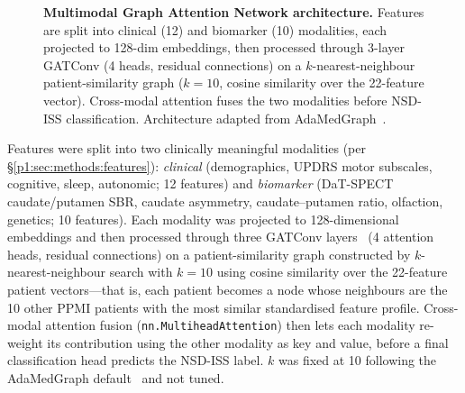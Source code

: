 \begin{figure}[!t]
\caption{\textbf{Multimodal Graph Attention Network architecture.} Features are split into clinical (12) and biomarker (10) modalities, each projected to 128-dim embeddings, then processed through 3-layer GATConv (4 heads, residual connections) on a $k$-nearest-neighbour patient-similarity graph ($k{=}10$, cosine similarity over the 22-feature vector). Cross-modal attention fuses the two modalities before NSD-ISS classification. Architecture adapted from AdaMedGraph~\cite{adamedgraph}.}
\label{p1:fig:architecture}
\end{figure}

Features were split into two clinically meaningful modalities (per \S\ref{p1:sec:methods:features}): \textit{clinical} (demographics, UPDRS motor subscales, cognitive, sleep, autonomic; 12 features) and \textit{biomarker} (DaT-SPECT caudate/putamen SBR, caudate asymmetry, caudate--putamen ratio, olfaction, genetics; 10 features). Each modality was projected to 128-dimensional embeddings and then processed through three GATConv layers~\cite{velickovic2018gat} (4 attention heads, residual connections) on a patient-similarity graph constructed by $k$-nearest-neighbour search with $k{=}10$ using cosine similarity over the 22-feature patient vectors---that is, each patient becomes a node whose neighbours are the 10 other PPMI patients with the most similar standardised feature profile. Cross-modal attention fusion (\texttt{nn.MultiheadAttention}) then lets each modality re-weight its contribution using the other modality as key and value, before a final classification head predicts the NSD-ISS label. $k$ was fixed at 10 following the AdaMedGraph default~\cite{adamedgraph} and not tuned.

